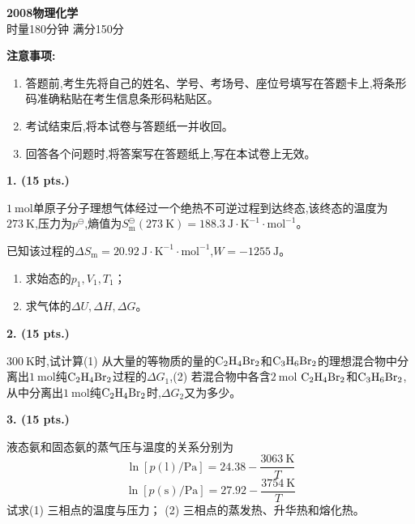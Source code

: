 \begin{center}
    {\LARGE \textbf{2008物理化学}} \\[2ex]
    {\large 时量180分钟 \quad 满分150分}
\end{center}

\vspace{0.5cm}
\noindent\textbf{注意事项:}
\begin{enumerate}[label=\arabic*., parsep=0pt, itemsep=0pt]
    \item 答题前,考生先将自己的姓名、学号、考场号、座位号填写在答题卡上,将条形码准确粘贴在考生信息条形码粘贴区。
    \item 考试结束后,将本试卷与答题纸一并收回。
    \item 回答各个问题时,将答案写在答题纸上,写在本试卷上无效。
\end{enumerate}

\vspace{0.5cm}
\noindent\textbf{1. (15 pts.)}

$1\ \mathrm{mol}$单原子分子理想气体经过一个绝热不可逆过程到达终态,该终态的温度为$273\ \mathrm{K}$,压力为$p^\ominus$,熵值为$S_\mathrm{m}^\ominus(273\ \mathrm{K})=188.3\ \mathrm{J\cdot K^{-1}\cdot mol^{-1}}$。

已知该过程的$\Delta S_\mathrm{m}=20.92\ \mathrm{J\cdot K^{-1}\cdot mol^{-1}}$,$W=-1255\ \mathrm{J}$。
\begin{enumerate}[label=(\arabic*), itemsep=1ex]
    \item 求始态的$p_1,V_1,T_1$；
    \item 求气体的$\Delta U,\Delta H,\Delta G$。
\end{enumerate}

\vspace{0.5cm}
\noindent\textbf{2. (15 pts.)}

$300\ \mathrm{K}$时,试计算(1) 从大量的等物质的量的$\ce{C_{2}H_{4}Br_{2}}$和$\ce{C_{3}H_{6}Br_{2}}$的理想混合物中分离出$1\ \mathrm{mol}$纯$\ce{C_{2}H_{4}Br_{2}}$过程的$\Delta G_1$,(2) 若混合物中各含$2\ \mathrm{mol}$ $\ce{C_{2}H_{4}Br_{2}}$和$\ce{C_{3}H_{6}Br_{2}}$,从中分离出$1\ \mathrm{mol}$纯$\ce{C_{2}H_{4}Br_{2}}$时,$\Delta G_2$又为多少。

\vspace{0.5cm}
\noindent\textbf{3. (15 pts.)}

液态氨和固态氨的蒸气压与温度的关系分别为
\[
\ln[p(\mathrm{l})/\mathrm{Pa}]=24.38-\frac{3063\ \mathrm{K}}{T}
\]
\[
\ln[p(\mathrm{s})/\mathrm{Pa}]=27.92-\frac{3754\ \mathrm{K}}{T}
\]
试求(1) 三相点的温度与压力；
(2) 三相点的蒸发热、升华热和熔化热。

